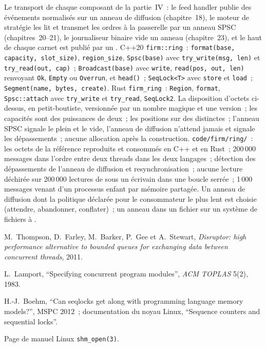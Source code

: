 \begin{build}
 Le transport de chaque composant de la partie~IV~: le feed handler publie des événements normalisés sur un anneau de diffusion
(chapitre~18), le moteur de stratégie les lit et transmet les ordres à la passerelle par un anneau SPSC (chapitres~20--21), le journaliseur binaire
vide un anneau (chapitre~23), et le haut de chaque carnet est publié par un .
 C++20 \texttt{firm::ring}~: \texttt{format(base, capacity, slot\_size)}, \texttt{region\_size},
\texttt{Spsc(base)} avec \texttt{try\_write(msg, len)} et \texttt{try\_read(out, cap)}~; \texttt{Broadcast(base)} avec
\texttt{write}, \texttt{read(pos, out, len)} renvoyant \texttt{Ok}, \texttt{Empty} ou \texttt{Overrun}, et \texttt{head()}~;
\texttt{SeqLock<T>} avec \texttt{store} et \texttt{load}~; \texttt{Segment(name, bytes, create)}. Rust \texttt{firm\_ring}~:
\texttt{Region}, \texttt{format}, \texttt{Spsc::attach} avec \texttt{try\_write} et \texttt{try\_read}, \texttt{SeqLock2}.
 La disposition d'octets ci-dessus, en petit-boutiste, versionnée par un nombre magique et une version~; les capacités sont des puissances
de deux~; les positions sur des  distinctes~; l'anneau SPSC signale le plein et le vide, l'anneau de diffusion n'attend jamais et signale
les dépassements~; aucune allocation après la construction.
 \texttt{code/firm/ring/}~: les octets de la référence reproduits et consommés en C++ et en Rust~; 200\,000
messages dans l'ordre entre deux threads dans les deux langages~; détection des dépassements de l'anneau de diffusion et resynchronisation~; aucune lecture déchirée sur 200\,000
lectures de  sous un écrivain dans une boucle serrée~; 1\,000 messages venant d'un processus enfant par mémoire partagée.
 Un anneau de diffusion dont la politique déclarée pour le consommateur le plus lent est choisie (attendre, abandonner, conflater)~;
un anneau dans un fichier sur un système de fichiers à .
\end{build}

\begin{omsources}
\item M.~Thompson, D.~Farley, M.~Barker, P.~Gee et A.~Stewart, \emph{Disruptor: high performance alternative to bounded queues
for exchanging data between concurrent threads}, 2011.
\item L.~Lamport, ``Specifying concurrent program modules'', \emph{ACM TOPLAS} 5(2), 1983.
\item H.-J.~Boehm, ``Can seqlocks get along with programming language memory models?'', MSPC 2012~; documentation du noyau Linux,
``Sequence counters and sequential locks''.
\item Page de manuel Linux \texttt{shm\_open(3)}.
\end{omsources}

